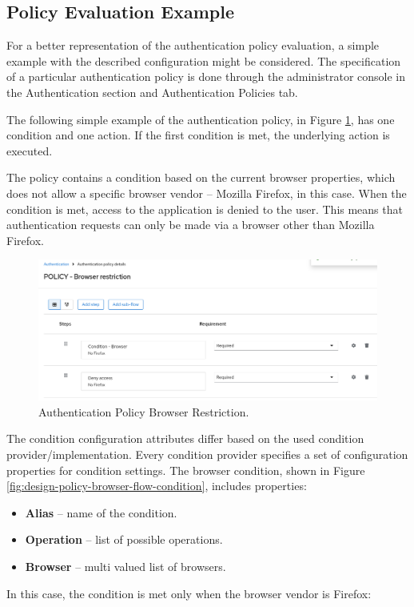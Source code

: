 \newpage

\subsection{Policy Evaluation Example}
For a better representation of the authentication policy evaluation, a simple example with the described configuration might be considered.
The specification of a particular authentication policy is done through the administrator console in the Authentication section and Authentication Policies tab.

The following simple example of the authentication policy, in Figure \ref{fig:design-policy-browser-flow}, has one condition and one action.
If the first condition is met, the underlying action is executed.

The policy contains a condition based on the current browser properties, which does not allow a specific browser vendor -- Mozilla Firefox, in this case.
When the condition is met, access to the application is denied to the user.
This means that authentication requests can only be made via a browser other than Mozilla Firefox.

\begin{figure}[htbp]
  \centering
  \includegraphics[width=1\textwidth]{img/sections/5-design/policy-browser-flow.png}
  \caption{Authentication Policy Browser Restriction.}
  \label{fig:design-policy-browser-flow}
\end{figure}

The condition configuration attributes differ based on the used condition provider/implementation.
Every condition provider specifies a set of configuration properties for condition settings.
\newline
\newline
The browser condition, shown in Figure \ref{fig:design-policy-browser-flow-condition}, includes properties:

\begin{itemize}
    \item \textbf{Alias} -- name of the condition.
    \item \textbf{Operation} -- list of possible operations.
    \item \textbf{Browser} -- multi valued list of browsers. 
\end{itemize}
In this case, the condition is met only when the browser vendor is Firefox:

